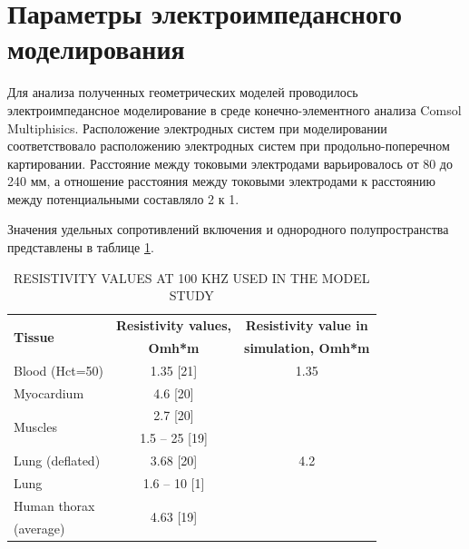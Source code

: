 \documentclass[conference]{IEEEtran}
\begin{document}
\section{Параметры электроимпедансного моделирования}
Для анализа полученных геометрических моделей проводилось электроимпедансное моделирование в среде конечно-элементного анализа Comsol Multiphisics.
Расположение электродных систем при моделировании соответствовало расположению электродных систем при продольно-поперечном картировании. Расстояние между токовыми электродами варьировалось от 80 до 240 мм, а отношение расстояния между токовыми электродами к расстоянию между потенциальными составляло 2 к 1.

Значения удельных сопротивлений включения и однородного полупространства представлены в таблице \ref{tab:table}.

\begin{table}[htbp]
    \caption{RESISTIVITY VALUES AT 100 KHZ USED IN THE MODEL STUDY}
    \begin{center}
        \begin{tabular}{|l|c|c|}
            \hline
            \multirow{2}{*}{\textbf{Tissue}}              &     \textbf{Resistivity values,}      &    \textbf{Resistivity value in}  \\
            &    \textbf{ Omh*m}     &   \textbf{ simulation, Omh*m }\\
            \hline
            Blood (Hct=50)           & 1.35 [21]           & 1.35      \\
            \hline
            Myocardium               & 4.6 [20]       & \multirow{7}{*}{4.2}\\
            \cline{1-2}
            \multirow{2}{*}{Muscles} & 2.7 [20]          &     \\
            \cline{2-2}
            & 1.5 – 25 [19]           &   \\
            \cline{1-2}
            Lung (deflated)          & 3.68 [20]     &         \\
            \cline{1-2}
            Lung                     & 1.6 – 10 [1]       &    \\
            \cline{1-2}
            Human thorax & \multirow{2}{*}{4.63 [19]}  &   \\
            (average)   & &   \\
            \hline
        \end{tabular}
        \label{tab:table}
    \end{center}
\end{table}
\end{document}
